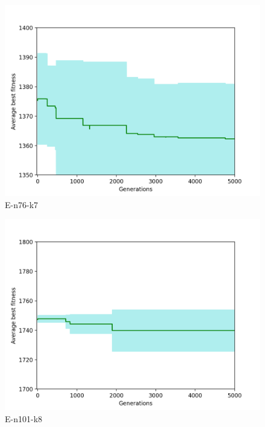 \documentclass[conference,compsoc]{IEEEtran}
\begin{document}
\begin{figure}[h!]
    \centering
    \includegraphics[scale=0.35]{E-n76-k7}
    \caption{E-n76-k7}
    \label{fig:my_label}
\end{figure}


\begin{figure}[h!]
    \centering
    \includegraphics[scale=0.35]{E-n101-k8}
    \caption{E-n101-k8}
    \label{fig:my_label}
\end{figure}
\end{document}
